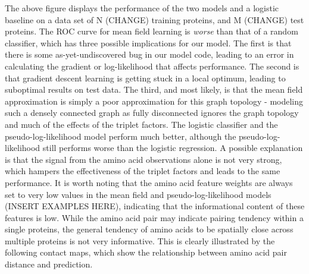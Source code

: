 \documentclass{article}
\begin{document}
The above figure displays the performance of the two models and a logistic baseline on a data set of N (CHANGE) training proteins, and M (CHANGE) test proteins. The ROC curve for  mean field learning is \textit{worse} than that of a random classifier, which has three possible implications for our model. The first is that there is some as-yet-undiscovered bug in our model code, leading to an error in calculating the gradient or log-likelihood that affects performance. The second is that gradient descent learning is getting stuck in a local optimum, leading to suboptimal results on test data. The third, and most likely, is that the mean field approximation is simply a poor approximation for this graph topology - modeling such a densely connected graph as fully disconnected ignores the graph topology and much of the effects of the triplet factors. The logistic classifier and the pseudo-log-likelihood model perform much better, although the pseudo-log-likelihood still performs worse than the logistic regression. A possible explanation is that the signal from the amino acid observations alone is not very strong, which hampers the effectiveness of the triplet factors and leads to the same performance. It is worth noting that the amino acid feature weights are always set to very low values in the mean field and pseudo-log-likelihood models (INSERT EXAMPLES HERE), indicating that the informational content of these features is low. While the amino acid pair may indicate pairing tendency within a single proteins, the general tendency of amino acids to be spatially close across multiple proteins is not very informative. This is clearly illustrated by the following contact maps, which show the relationship between amino acid pair distance and prediction. 
\end{document}
